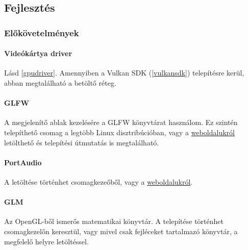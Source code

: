 
\subsection{Fejleszt\'es}
\subsubsection{El\H ok\"ovetelm\'enyek}
\paragraph{Vide\'ok\'artya driver}
L\'asd \ref{gpudriver}.
Amennyiben a Vulkan SDK (\ref{vulkansdk}) telep\'it\'esre ker\"ul, abban megtal\'alhat\'o a bet\"olt\H o r\'eteg.

\paragraph{GLFW}
A megjelen\'it\H o ablak kezel\'es\'ere a GLFW k\"onyvt\'arat haszn\'alom. Ez szint\'en telep\'ithet\H o csomag a legt\"obb Linux disztrib\'uci\'oban, vagy a \href{http://www.glfw.org/download.html}{weboldalukr\'ol} let\"olthet\H o \'es telep\'it\'esi \'utmutat\'as is megtal\'alhat\'o. 

\paragraph{PortAudio}
A let\"olt\'ese t\"ort\'enhet csomagkeze\H ob\H ol, vagy a \href{http://www.portaudio.com/download.html}{weboldalukr\'ol}.

\paragraph{GLM}
Az OpenGL-b\H ol ismer\H os matematikai k\"onyvt\'ar. 
A telep\'it\'ese t\"ort\'enhet csomagkezel\H on kereszt\"ul, vagy mivel csak fejl\'eceket tartalmaz\'o k\"onyvt\'ar, a megfelel\H o helyre let\"olt\'essel.

